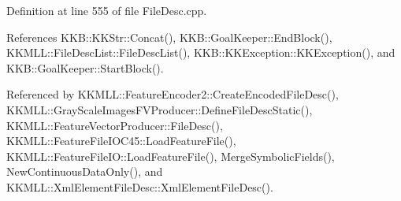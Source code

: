 Definition at line 555 of file File\+Desc.\+cpp.



References K\+K\+B\+::\+K\+K\+Str\+::\+Concat(), K\+K\+B\+::\+Goal\+Keeper\+::\+End\+Block(), K\+K\+M\+L\+L\+::\+File\+Desc\+List\+::\+File\+Desc\+List(), K\+K\+B\+::\+K\+K\+Exception\+::\+K\+K\+Exception(), and K\+K\+B\+::\+Goal\+Keeper\+::\+Start\+Block().



Referenced by K\+K\+M\+L\+L\+::\+Feature\+Encoder2\+::\+Create\+Encoded\+File\+Desc(), K\+K\+M\+L\+L\+::\+Gray\+Scale\+Images\+F\+V\+Producer\+::\+Define\+File\+Desc\+Static(), K\+K\+M\+L\+L\+::\+Feature\+Vector\+Producer\+::\+File\+Desc(), K\+K\+M\+L\+L\+::\+Feature\+File\+I\+O\+C45\+::\+Load\+Feature\+File(), K\+K\+M\+L\+L\+::\+Feature\+File\+I\+O\+::\+Load\+Feature\+File(), Merge\+Symbolic\+Fields(), New\+Continuous\+Data\+Only(), and K\+K\+M\+L\+L\+::\+Xml\+Element\+File\+Desc\+::\+Xml\+Element\+File\+Desc().


